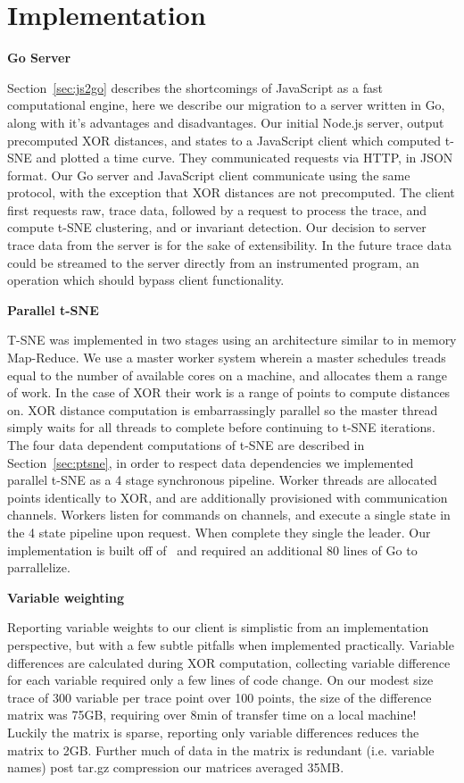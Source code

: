 \section{Implementation}
\label{sec:imp}

\textbf{Go Server}

Section~\ref{sec:js2go} describes the shortcomings of JavaScript as a
fast computational engine, here we describe our migration to a server
written in Go, along with it's advantages and disadvantages. Our
initial Node.js server, output precomputed XOR distances, and states
to a JavaScript client which computed t-SNE and plotted a time curve.
They communicated requests via HTTP, in JSON format. Our Go server and
JavaScript client communicate using the same protocol, with the
exception that XOR distances are not precomputed. The client first
requests raw, trace data, followed by a request to process the trace,
and compute t-SNE clustering, and or invariant detection. Our
decision to server trace data from the server is for the sake of
extensibility. In the future trace data could be streamed to the
server directly from an instrumented program, an operation which
should bypass client functionality.

\textbf{Parallel t-SNE}

T-SNE was implemented in two stages using an architecture similar to
in memory Map-Reduce. We use a master worker system wherein a master
schedules treads equal to the number of available cores on a machine,
and allocates them a range of work. In the case of XOR their work is a
range of points to compute distances on. XOR distance computation is
embarrassingly parallel so the master thread simply waits for all
threads to complete before continuing to t-SNE iterations.
%
The four data dependent computations of t-SNE are described in
Section~\ref{sec:ptsne}, in order to respect data dependencies we
implemented parallel t-SNE as a 4 stage synchronous pipeline. Worker
threads are allocated points identically to XOR, and are additionally
provisioned with communication channels. Workers listen for commands
on channels, and execute a single state in the 4 state pipeline upon
request. When complete they single the leader.
%
Our implementation is built off of~\cite{tsne4go} and required an
additional 80 lines of Go to parrallelize.

\textbf{Variable weighting}

Reporting variable weights to our client is simplistic from an
implementation perspective, but with a few subtle pitfalls when
implemented practically. Variable differences are calculated during XOR
computation, collecting variable difference for each variable required
only a few lines of code change. On our modest size trace of 300
variable per trace point over 100 points, the size of the difference
matrix was 75GB, requiring over 8min of transfer time on a local
machine! Luckily the matrix is sparse, reporting only variable
differences reduces the matrix to 2GB. Further much of data in the
matrix is redundant (i.e. variable names) post tar.gz compression our
matrices averaged 35MB.

